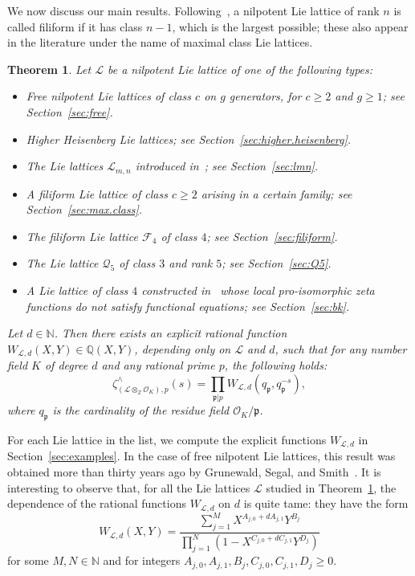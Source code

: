 \documentclass[11pt,a4paper]{amsart}
\theoremstyle{plain}
\newtheorem{thm}{Theorem}[section]
\theoremstyle{remark}
\newcommand{\N}{\mathbb{N}}
\newcommand{\Z}{\mathbb{Z}}
\newcommand{\tensor}{\otimes}
\newcommand{\p}{\mathfrak{p}}
\def \p {\ensuremath{\mathfrak{p}}}
\begin{document}
We now discuss our main results.  Following~\cite[\S1.5]{Vergne/70}, a nilpotent Lie lattice of rank $n$ is called filiform if it has class $n-1$, which is the largest possible; these also appear in the literature under the name of maximal class Lie lattices.  

\begin{thm} \label{thm:intro.examples}
Let $\mathcal{L}$ be a nilpotent Lie lattice of one of the following types:
\begin{itemize}
\item Free nilpotent Lie lattices of class $c$ on $g$ generators, for $c \geq 2$ and $g \geq 1$; see Section~\ref{sec:free}.
\item Higher Heisenberg Lie lattices; see Section~\ref{sec:higher.heisenberg}.
\item The Lie lattices $\mathcal{L}_{m,n}$ introduced in~\cite{BKO/Dstar}; see Section~\ref{sec:lmn}.
\item A filiform Lie lattice of class $c \geq 2$ arising in a certain family; see Section~\ref{sec:max.class}.
\item The filiform Lie lattice $\mathcal{F}_4$ of class $4$; see Section~\ref{sec:filiform}.
\item The Lie lattice $\mathcal{Q}_5$ of class $3$ and rank $5$; see Section~\ref{sec:Q5}.
\item A Lie lattice of class $4$ constructed in~\cite{BK/15} whose local pro-isomorphic zeta functions do not satisfy functional equations; see Section~\ref{sec:bk}.
\end{itemize}
Let $d \in \mathbb{N}$.  Then there exists an explicit rational function $W_{\mathcal{L},d}(X,Y) \in \mathbb{Q}(X,Y)$, depending only on $\mathcal{L}$ and $d$, such that for any number field $K$ of degree $d$ and any rational prime $p$, the following holds:
\begin{equation} \label{equ:mini.euler.product}
\zeta^\wedge_{(\mathcal{L} \tensor_\Z \mathcal{O}_K),p}(s) = \prod_{\p | p} W_{\mathcal{L},d}(q_{\p}, q_{\p}^{-s}),
\end{equation}
where $q_{\p}$ is the cardinality of the residue field $\mathcal{O}_K / \p$.
\end{thm}

For each Lie lattice in the list, we compute the explicit functions $W_{\mathcal{L},d}$ in Section~\ref{sec:examples}.  In the case of free nilpotent Lie lattices, this result was obtained more than thirty years ago by Grunewald, Segal, and Smith~\cite[Theorem~7.1]{GSS/88}.
It is interesting to observe that, for all the Lie lattices $\mathcal{L}$ studied in Theorem~\ref{thm:intro.examples}, the dependence of the rational functions $W_{\mathcal{L},d}$ on $d$ is quite tame: they have the form
\begin{equation} \label{equ:rat.funct.form}
W_{\mathcal{L},d}(X,Y) = \frac{ \sum_{j = 1}^M X^{A_{j,0} + dA_{j,1}} Y^{B_j} }{\prod_{j = 1}^N (1 - X^{C_{j,0} + dC_{j,1}} Y^{D_{j}})}
\end{equation}
for some $M,N \in \N$ and for integers $A_{j,0}, A_{j,1}, B_j, C_{j,0}, C_{j,1}, D_j \geq 0$.  
\end{document}

